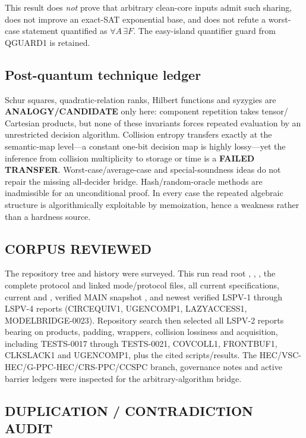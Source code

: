 \documentclass[11pt]{article}
\begin{document}
This result does \emph{not} prove that arbitrary clean-core inputs admit such
sharing, does not improve an exact-SAT exponential base, and does not refute a
worst-case statement quantified as \(\forall A\,\exists F\).  The easy-island
quantifier guard from QGUARD1 is retained.

\subsection*{Post-quantum technique ledger}

Schur squares, quadratic-relation ranks, Hilbert functions and syzygies are
\textbf{ANALOGY/CANDIDATE} only here: component repetition takes tensor/
Cartesian products, but none of these invariants forces repeated evaluation by
an unrestricted decision algorithm.  Collision entropy transfers exactly at
the semantic-map level---a constant one-bit decision map is highly lossy---yet
the inference from collision multiplicity to storage or time is a
\textbf{FAILED TRANSFER}.  Worst-case/average-case and special-soundness ideas
do not repair the missing all-decider bridge.  Hash/random-oracle methods are
inadmissible for an unconditional proof.  In every case the repeated algebraic
structure is algorithmically exploitable by memoization, hence a weakness
rather than a hardness source.

\subsection*{CORPUS REVIEWED}

The repository tree and history were surveyed.  This run read root
, , , the complete
 protocol and linked mode/protocol
files, all current  specifications, current  and
, verified MAIN snapshot
, and newest
verified LSPV-1 through LSPV-4 reports (CIRCEQUIV1, UGENCOMP1, LAZYACCESS1,
MODELBRIDGE-0023).  Repository search then selected all LSPV-2 reports bearing
on products, padding, wrappers, collision lossiness and acquisition, including
TESTS-0017 through TESTS-0021, COVCOLL1, FRONTBUF1, CLKSLACK1 and UGENCOMP1,
plus the cited scripts/results.  The HEC/VSC-HEC/G-PPC-HEC/CRS-PPC/CCSPC
branch, governance notes and active barrier ledgers were inspected for the
arbitrary-algorithm bridge.

\subsection*{DUPLICATION / CONTRADICTION AUDIT}
\end{document}
